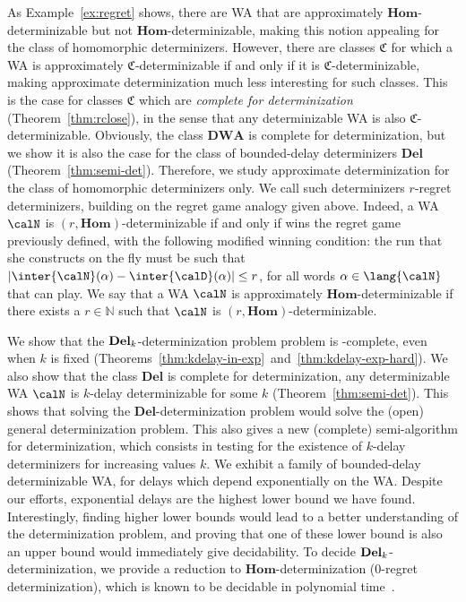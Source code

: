 As Example~\ref{ex:regret} shows, there are WA that are approximately
$\mathbf{Hom}$-determinizable but not $\mathbf{Hom}$-determinizable, making
this notion appealing for the class of homomorphic determinizers. However,
there are classes $\mathfrak{C}$ for which a WA is approximately
$\mathfrak{C}$-determinizable if and only if it is
$\mathfrak{C}$-determinizable, making approximate determinization much less
interesting for such classes. This is the case for classes $\mathfrak{C}$ which
are \emph{complete for determinization} (Theorem~\ref{thm:rclose}), in the sense
that any determinizable WA is also $\mathfrak{C}$-determinizable. Obviously, the
class $\mathbf{DWA}$ is complete for determinization, but we show it is also the
case for the class of bounded-delay determinizers $\mathbf{Del}$
(Theorem~\ref{thm:semi-det}).
%
Therefore, we study approximate determinization for the class of homomorphic
determinizers only. We call such determinizers $r$-regret
determinizers, building on the regret game analogy given above. Indeed, a WA
$\calN$ is $(r,\mathbf{Hom})$-determinizable if and only if \eve wins the regret game
previously defined, with the following modified winning condition: the run that she
constructs on the fly must be such that
$|\inter{\calN}(\alpha)-\inter{\calD}(\alpha)|\leq r$, for all words $\alpha \in
\lang{\calN}$ that \adam can play.
We say that a WA $\calN$ is approximately $\mathbf{Hom}$-determinizable if
there exists a $r \in \mathbb{N}$ such that $\calN$ is
$(r,\mathbf{Hom})$-determinizable.


 We show that the ${\bf Del}_k$-determinization problem
problem is \EXP-complete, even when $k$ is fixed
(Theorems~\ref{thm:kdelay-in-exp}~and~\ref{thm:kdelay-exp-hard}).
We also show that the class $\mathbf{Del}$ is
complete for determinization, \ie any determinizable WA $\calN$
is $k$-delay determinizable for some $k$ (Theorem~\ref{thm:semi-det}). This shows that
solving the $\mathbf{Del}$-determinization problem would solve the
(open) general determinization problem. This also gives a new
(complete) semi-algorithm for determinization, which consists in testing for the
existence of $k$-delay determinizers for increasing values $k$.  %
We exhibit a family of bounded-delay determinizable WA, for delays
which depend exponentially on the WA. Despite our efforts, exponential delays
are the highest lower bound we have found. Interestingly, finding higher lower
bounds would lead to a better understanding of the determinization
problem, and proving that one of these lower bound is also an upper bound would
immediately give decidability. 
To decide ${\bf Del}_k$-determinization, we provide
a reduction to $\mathbf{Hom}$-determinization (\ie $0$-regret determinization),
which is known to be decidable in polynomial time~\cite{akl10}. 


